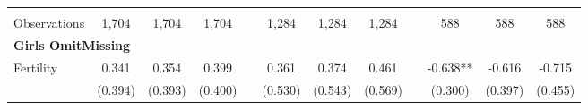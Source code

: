 \begin{landscape}
\begin{table}[htpb!]
\begin{center}
\begin{tabular}{lcccp{2mm}cccp{2mm}ccc}
\begin{footnotesize}\end{footnotesize}&\begin{footnotesize}\end{footnotesize}&\begin{footnotesize}\end{footnotesize}&\begin{footnotesize}\end{footnotesize}&\begin{footnotesize}\end{footnotesize}&\begin{footnotesize}\end{footnotesize}&\begin{footnotesize}\end{footnotesize}&\begin{footnotesize}\end{footnotesize}&\begin{footnotesize}\end{footnotesize}&\begin{footnotesize}\end{footnotesize}&\begin{footnotesize}\end{footnotesize}&\begin{footnotesize}\end{footnotesize}\\Observations&1,704&1,704&1,704&&1,284&1,284&1,284&&588&588&588\\
\multicolumn{12}{l}{\textbf{Girls OmitMissing}}\\ 
Fertility&0.341&0.354&0.399&&0.361&0.374&0.461&&-0.638**&-0.616&-0.715\\
&(0.394)&(0.393)&(0.400)&&(0.530)&(0.543)&(0.569)&&(0.300)&(0.397)&(0.455)\\

\end{tabular}
\end{center}
\end{table}
\end{landscape}
